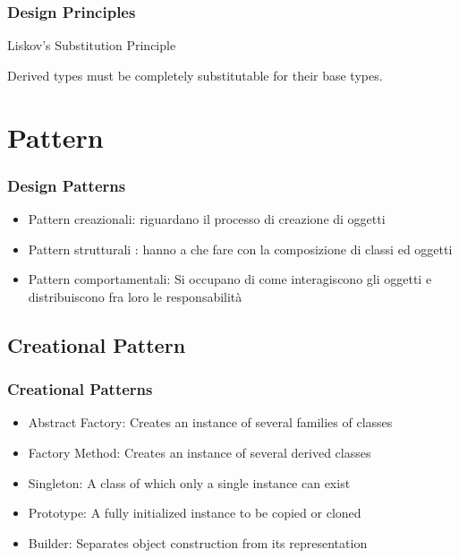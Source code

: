\documentclass{beamer}
\begin{document}
\begin{frame}
\frametitle{Design Principles}
Liskov's Substitution Principle
\begin{framed}
Derived types must be completely substitutable for their base types.
\end{framed}
\end{frame}



\section{Pattern}

\begin{frame}
\frametitle{Design Patterns}

\begin{itemize}
\item Pattern	creazionali: riguardano	il	processo	di	creazione	di	oggetti	
\item Pattern	strutturali	: hanno	a	che	fare	con	la	composizione	di	classi	ed	 oggetti
\item Pattern	comportamentali: Si	occupano	di	come	interagiscono	gli	oggetti	e	distribuiscono	fra	loro	le	responsabilit\`a
\end{itemize}


\end{frame}

\subsection{Creational Pattern}

\begin{frame}
\frametitle{Creational Patterns}
\begin{itemize}
\item Abstract	Factory:	Creates	an	instance	of	several	families	of	classes	
\item Factory	Method:	Creates	an	instance	of	several	derived	classes
\item Singleton:	A	class	of	which	only	a	single	instance	can	exist	
\item Prototype:	A	fully	initialized	instance	to	be	copied	or	cloned	
\item Builder:	Separates	object	construction	from	its	 representation	
\end{itemize}
\end{frame}
\end{document}

